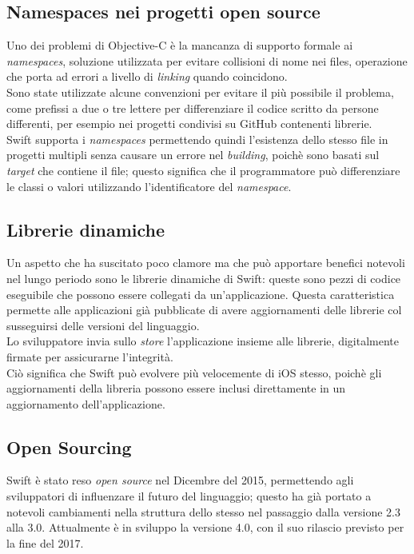 \subsection{Namespaces nei progetti open source}
Uno dei problemi di Objective-C è la mancanza di supporto formale ai \textit{namespaces}, soluzione utilizzata per evitare collisioni di nome nei files, operazione che porta ad errori a livello di \textit{linking} quando coincidono.\\Sono state utilizzate alcune convenzioni per evitare il più possibile il problema, come prefissi a due o tre lettere per differenziare il codice scritto da persone differenti, per esempio nei progetti condivisi su GitHub contenenti librerie.\\
Swift supporta i \textit{namespaces} permettendo quindi l'esistenza dello stesso file in progetti multipli senza causare un errore nel \textit{building}, poichè sono basati sul \textit{target} che contiene il file; questo significa che il programmatore può differenziare le classi o valori utilizzando l'identificatore del \textit{namespace}.\\
\subsection{Librerie dinamiche}
Un aspetto che ha suscitato poco clamore ma che può apportare benefici notevoli nel lungo periodo sono le librerie dinamiche di Swift: queste sono pezzi di codice eseguibile che possono essere collegati da un'applicazione. Questa caratteristica permette alle applicazioni già pubblicate di avere aggiornamenti delle librerie col susseguirsi delle versioni del linguaggio.\\Lo sviluppatore invia sullo \textit{store} l'applicazione insieme alle librerie, digitalmente firmate per assicurarne l'integrità.\\Ciò significa che Swift può evolvere più velocemente di iOS stesso, poichè gli aggiornamenti della libreria possono essere inclusi direttamente in un aggiornamento dell'applicazione.\\
\subsection{Open Sourcing}
Swift è stato reso \textit{open source} nel Dicembre del 2015, permettendo agli sviluppatori di influenzare il futuro del linguaggio; questo ha già portato a notevoli cambiamenti nella struttura dello stesso nel passaggio dalla versione 2.3 alla 3.0. Attualmente è in sviluppo la versione 4.0, con il suo rilascio previsto per la fine del 2017.\newpage
